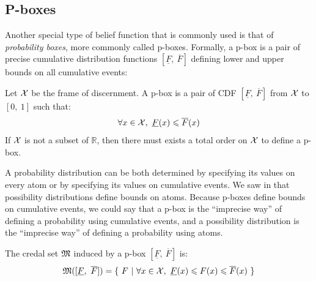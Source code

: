 \subsection{P-boxes}\label{sec:pboxes}
Another special type of belief function that is commonly used is that of \textit{probability boxes}, more commonly called p-boxes. Formally, a p-box is a pair of precise cumulative distribution functions $[\underline{F}, ~\overline{F}]$ defining lower and upper bounds on all cumulative events:

\begin{definition}[P-box]\label{def:p-box}
    Let $\mathcal{X}$ be the frame of discernment. A p-box is a pair of CDF $[\underline{F}, ~\overline{F}]$ from $\mathcal{X}$ to $[0, ~1]$ such that:
    \begin{equation}
    	\forall x \in \mathcal{X},~\underline{F}(x) \leqslant \overline{F}(x) \label{eq:p-box}
    \end{equation}
    If $\mathcal{X}$ is not a subset of $\mathbb{R}$, then there must exists a total order on $\mathcal{X}$ to define a p-box. 
\end{definition}

\begin{remark}
    A probability distribution can be both determined by specifying its values on every atom or by specifying its values on cumulative events. We saw in  that possibility distributions define bounds on atoms. Because p-boxes define bounds on cumulative events, we could say that a p-box is the ``imprecise way'' of defining a probability using cumulative events, and a possibility distribution is the ``imprecise way'' of defining a probability using atoms.
\end{remark}

The credal set $\mathfrak{M}$ induced by a p-box $[\underline{F}, ~\overline{F}]$ is:
\begin{align}
    \mathfrak{M}([\underline{F}, ~\overline{F}]) = \{~ F ~|~ \forall x\in\mathcal{X}, ~\underline{F}(x)\leqslant F(x)\leqslant \overline{F}(x) ~\}
\end{align}

